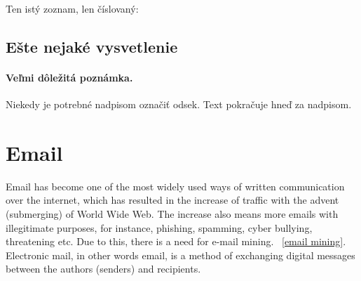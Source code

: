 \documentclass[10pt,twoside,slovak,a4paper]{article}
\begin{document}
Ten istý zoznam, len číslovaný:



\subsection{Ešte nejaké vysvetlenie} \label{ina:este}

\paragraph{Veľmi dôležitá poznámka.}
Niekedy je potrebné nadpisom označiť odsek. Text pokračuje hneď za nadpisom.



\section{Email} \label{comparison}
Email has become one of the most widely used ways of written communication over the internet, which has resulted in the increase of traffic with the advent (submerging) of World Wide Web. The increase also means more emails with illegitimate purposes, for instance, phishing, spamming, cyber bullying, threatening etc. Due to this, there is a need for e-mail mining. ~\ref{email mining}. Electronic mail, in other words email, is a method of exchanging digital messages between the authors (senders) and recipients. 
\end{document}
